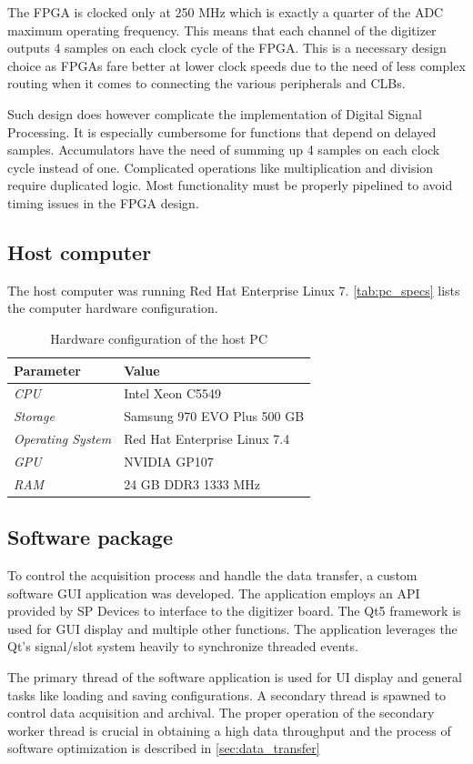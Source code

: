 The FPGA is clocked only at 250 MHz which is exactly a quarter of 
the ADC maximum operating frequency. This means that each channel
of the digitizer outputs 4 samples on each clock cycle of the 
FPGA. This is a necessary design choice as FPGAs fare better 
at lower clock speeds due to the need of less complex routing
when it comes to connecting the various peripherals and CLBs.


Such design does however complicate the implementation of 
Digital Signal Processing. It is especially cumbersome for 
functions that depend on delayed samples.
Accumulators have the need of summing up 4 samples on
each clock cycle instead of one. Complicated operations
like multiplication and division require duplicated logic.
Most functionality must be properly pipelined to avoid
timing issues in the FPGA design.

\subsection{Host computer}

The host computer was running Red Hat Enterprise Linux 7.
\autoref{tab:pc_specs} lists the computer hardware configuration.
\begin{table}[H]
\caption{Hardware configuration of the host PC}
\centering
  \begin{tabular}{l | l}
  {\bfseries Parameter} & {\bfseries Value}\\
  \hline
  \textit {CPU}             & Intel Xeon C5549 \\ \hline
  \textit {Storage}  & Samsung 970 EVO Plus 500 GB \\ \hline
  \textit {Operating System}   & Red Hat Enterprise Linux 7.4\\ \hline
  \textit {GPU}         & NVIDIA GP107 \\ \hline
  \textit {RAM}      & 24 GB DDR3 1333 MHz\\ 
  \end{tabular}
  \label{tab:pc_specs}
\end{table}

\subsection{Software package}
To control the acquisition process and handle the data transfer,
a custom software GUI application was developed. The application
employs an API provided by SP Devices to interface to the digitizer board.
The Qt5 framework is used for GUI display and multiple other functions.
The application leverages the Qt's signal/slot system heavily to synchronize
threaded events.


The primary thread of the software application
is used for UI display and general tasks like 
loading and saving configurations. A secondary thread
is spawned to control data acquisition and archival.
The proper operation of the secondary worker thread
is crucial in obtaining a high data throughput and 
the process of software optimization is described in 
\autoref{sec:data_transfer}
